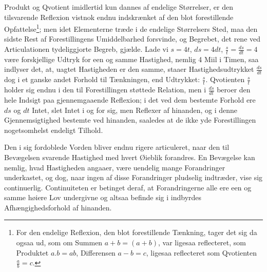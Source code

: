 \documentclass[12pt,a4paper]{book}
\begin{document}
Produkt og Qvotient imidlertid kun dannes af endelige Størrelser, er
den tilsvarende Reflexion vistnok endnu indskrænket af den blot
forestillende Opfattelse\footnote{For den endelige Reflexion, den blot
forestillende Tænkning, tager det sig da ogsaa ud, som om Summen $a +
b = (a + b)$, var ligesaa reflecteret, som Produktet $a.b = ab$,
Differensen $a - b = c$, ligesaa reflecteret som Qvotienten
$\frac{a}{b} = c$.}; men idet Elementerne træde i de endelige
Størrelsers Sted, maa den sidste Rest af Forestillingens Umiddelbarhed
forsvinde, og Begrebet, det rene ved Articulationen tydeliggjorte
Begreb, gjælde. Lade vi $s = 4t$, $ds = 4dt$, $\frac{s}{t} =
\frac{ds}{dt} = 4$ være forskjellige Udtryk for een og samme
Hastighed, nemlig 4 Miil i Timen, saa indlyser det, at, uagtet
Hastigheden er den samme, staaer Hastighedsudtrykket $\frac{ds}{dt}$
dog i et ganske andet Forhold til Tænkningen, end Udtrykket:
$\frac{s}{t}$. Qvotienten $\frac{s}{t}$ holder sig endnu i den til
Forestillingen støttede Relation, men i $\frac{ds}{dt}$ beroer den
hele Indsigt paa gjennemgaaende Reflexion; i det ved dem bestemte
Forhold ere $ds$ og $dt$ Intet, slet Intet i og for sig, men Reflexer
af hinanden,
og i denne Gjennemsigtighed bestemte ved hinanden, saaledes at de ikke
yde Forestillingen nogetsomhelst endeligt Tilhold.

Den i sig fordoblede Vorden bliver endnu rigere articuleret, naar den
til Bevægelsen svarende Hastighed med hvert Øieblik forandres. En
Bevægelse kan nemlig, hvad Hastigheden angaaer, være uendelig mange
Forandringer underkastet, og dog, naar ingen af disse Forandringer
pludselig indtræder, vise sig continuerlig. Continuiteten er betinget
deraf, at Forandringerne alle ere een og samme høiere Lov undergivne
og altsaa befinde sig i indbyrdes Afhængighedsforhold af hinanden.
\end{document}
